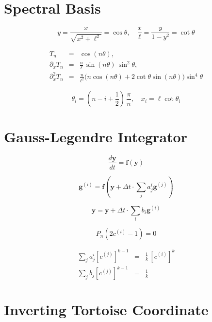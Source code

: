 \documentclass[aps,prd,reprint,twocolumn,groupedaddress]{revtex4-1}
\renewcommand{\vec}[1]{\mathbf{#1}}
\begin{document}
\section{Spectral Basis}

\begin{equation}
  y = \frac{x}{\sqrt{x^2+\ell^2}} = \cos\theta, \hspace{1em}
  \frac{x}{\ell} = \frac{y}{1-y^2} = \cot\theta
\end{equation}

\begin{eqnarray}
  T_n &=& \cos(n\theta),\\
  \partial_x T_n &=& \frac{n}{\ell}\, \sin(n\theta)\, \sin^2\theta,\\
  \partial_x^2 T_n &=& \frac{n}{\ell^2} \Big(n \cos(n\theta) + 2 \cot\theta \sin(n\theta)\Big) \sin^4\theta
\end{eqnarray}

\begin{equation}
  \theta_i = \left(n-i+\frac{1}{2}\right)\,\frac{\pi}{n}, \hspace{1em}
  x_i = \ell\cot\theta_i
\end{equation}

\section{Gauss-Legendre Integrator}

\begin{equation}
  \frac{d\vec{y}}{dt} = \vec{f}(\vec{y})
\end{equation}

\begin{equation}
  \vec{g}^{(i)} = \vec{f}\left(\vec{y} + \Delta t \cdot \sum\limits_j a^i_j \vec{g}^{(j)}\right)
\end{equation}

\begin{equation}
  \vec{y} = \vec{y} + \Delta t \cdot \sum\limits_i b_i \vec{g}^{(i)}
\end{equation}

\begin{equation}
  P_n\left(2c^{(i)}-1\right) = 0
\end{equation}

\begin{eqnarray}
  \sum\limits_j a^i_j \left[c^{(j)}\right]^{k-1} &=& \frac{1}{k}\, \left[c^{(i)}\right]^k\\
  \sum\limits_j b_j \left[c^{(j)}\right]^{k-1} &=& \frac{1}{k}
\end{eqnarray}


\appendix
\section{Inverting Tortoise Coordinate}
\end{document}
